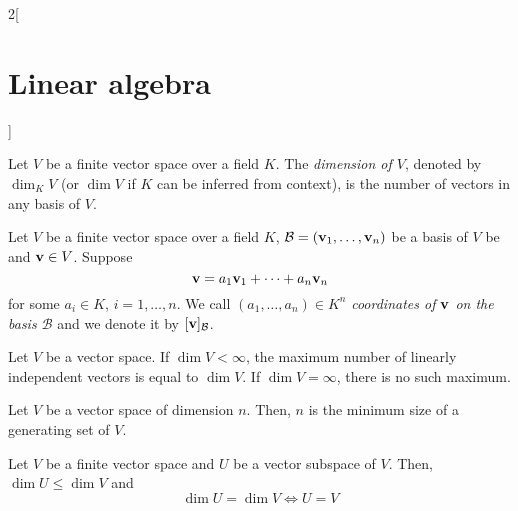 \documentclass[../../../main.tex]{subfiles}
\begin{document}
\begin{multicols}{2}[\section{Linear algebra}]
\begin{lemma}
  \end{lemma}
  \begin{definition}
    Let $V$ be a finite vector space over a field $K$. The \textit{dimension of $V$}, denoted by $\dim_K V$ (or $\dim V$ if $K$ can be inferred from context), is the number of vectors in any basis of $V$.
  \end{definition}
  \begin{definition}
    Let $V$ be a finite vector space over a field $K$, $\mathcal{B}=(\boldsymbol{\mathrm{v}}_1,\ldots,\boldsymbol{\mathrm{v}}_n)$ be a basis of $V$ be and $\boldsymbol{\mathrm{v}}\in V$. Suppose $$\boldsymbol{\mathrm{v}}=a_1\boldsymbol{\mathrm{v}}_1+\cdots+a_n\boldsymbol{\mathrm{v}}_n$$ for some $a_i\in K$, $i=1,\ldots,n$. We call $(a_1,\ldots,a_n)\in K^n$ \textit{coordinates of $\boldsymbol{\mathrm{v}}$ on the basis $\mathcal{B}$} and we denote it by $[\boldsymbol{\mathrm{v}}]_{\mathcal{B}}$.
  \end{definition}
  \begin{prop}
    Let $V$ be a vector space. If $\dim V<\infty$, the maximum number of linearly independent vectors is equal to $\dim V$. If $\dim V=\infty$, there is no such maximum.
  \end{prop}
  \begin{prop}
    Let $V$ be a vector space of dimension $n$. Then, $n$ is the minimum size of a generating set of $V$.
  \end{prop}
  \begin{prop}
    Let $V$ be a finite vector space and $U$ be a vector subspace of $V$. Then, $\dim U\leq\dim V$ and $$\dim U=\dim V\iff U=V$$
  \end{prop}

\end{multicols}
\end{document}
